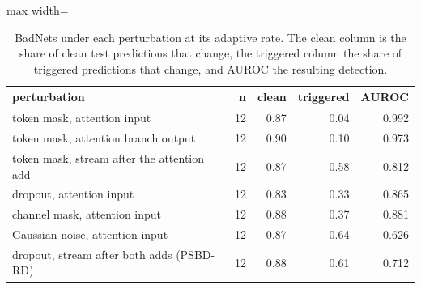 \begin{table}[htbp]
\centering
\small
\caption{BadNets under each perturbation at its adaptive rate. The clean column is the share of clean test predictions that change, the triggered column the share of triggered predictions that change, and AUROC the resulting detection.}
\label{tab:survival-sites}
\begin{adjustbox}{max width=\linewidth}
\begin{tabular}{lrrrr}
\toprule
perturbation & n & clean & triggered & AUROC \\
\midrule
token mask, attention input & 12 & 0.87 & 0.04 & 0.992 \\
token mask, attention branch output & 12 & 0.90 & 0.10 & 0.973 \\
token mask, stream after the attention add & 12 & 0.87 & 0.58 & 0.812 \\
dropout, attention input & 12 & 0.83 & 0.33 & 0.865 \\
channel mask, attention input & 12 & 0.88 & 0.37 & 0.881 \\
Gaussian noise, attention input & 12 & 0.87 & 0.64 & 0.626 \\
dropout, stream after both adds (PSBD-RD) & 12 & 0.88 & 0.61 & 0.712 \\
\bottomrule
\end{tabular}
\end{adjustbox}
\end{table}

